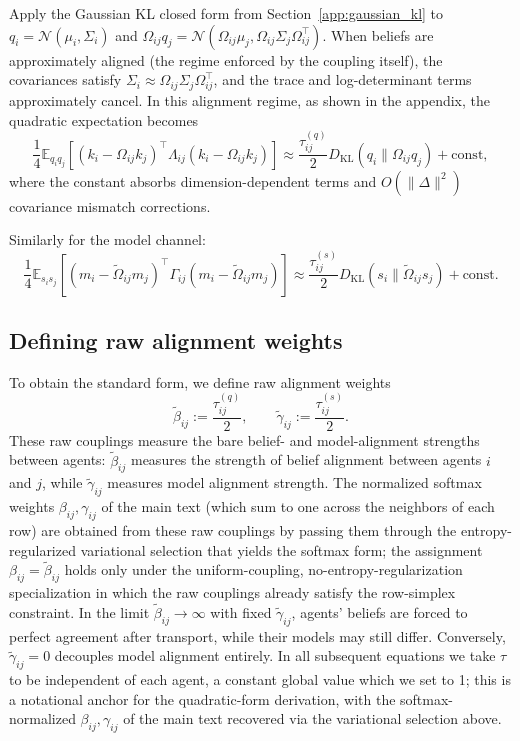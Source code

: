 \documentclass[11pt]{article}
\begin{document}
Apply the Gaussian KL closed form from Section~\ref{app:gaussian_kl} to $q_i = \mathcal{N}(\mu_i,\Sigma_i)$ and $\Omega_{ij}q_j = \mathcal{N}(\Omega_{ij}\mu_j, \Omega_{ij}\Sigma_j\Omega_{ij}^\top)$. When beliefs are approximately aligned (the regime enforced by the coupling itself), the covariances satisfy $\Sigma_i \approx \Omega_{ij}\Sigma_j\Omega_{ij}^\top$, and the trace and log-determinant terms approximately cancel. In this alignment regime, as shown in the appendix, the quadratic expectation becomes
\begin{equation}
\frac{1}{4}\mathbb{E}_{q_i q_j}
[(k_i-\Omega_{ij}k_j)^\top\Lambda_{ij}(k_i-\Omega_{ij}k_j)]
\approx
\frac{\tau^{(q)}_{ij}}{2}D_{\mathrm{KL}}(q_i\|\Omega_{ij}q_j)+\text{const},
\end{equation}
where the constant absorbs dimension-dependent terms and $O(\|\Delta\|^2)$ covariance mismatch corrections.

Similarly for the model channel:
\begin{equation}
\frac{1}{4}\mathbb{E}_{s_i s_j}
[(m_i-\tilde{\Omega}_{ij}m_j)^\top\Gamma_{ij}(m_i-\tilde{\Omega}_{ij}m_j)]
\approx
\frac{\tau^{(s)}_{ij}}{2}D_{\mathrm{KL}}(s_i\|\tilde{\Omega}_{ij}s_j)+\text{const}.
\end{equation}
\subsection{Defining raw alignment weights}
To obtain the standard form, we define raw alignment weights
\begin{equation}
\tilde\beta_{ij}:=\frac{\tau^{(q)}_{ij}}{2},
\qquad
\tilde\gamma_{ij}:=\frac{\tau^{(s)}_{ij}}{2}.
\end{equation}
These raw couplings measure the bare belief- and model-alignment strengths between agents: $\tilde\beta_{ij}$ measures the strength of belief alignment between agents $i$ and $j$, while $\tilde\gamma_{ij}$ measures model alignment strength. The normalized softmax weights $\beta_{ij}, \gamma_{ij}$ of the main text (which sum to one across the neighbors of each row) are obtained from these raw couplings by passing them through the entropy-regularized variational selection that yields the softmax form; the assignment $\beta_{ij} = \tilde\beta_{ij}$ holds only under the uniform-coupling, no-entropy-regularization specialization in which the raw couplings already satisfy the row-simplex constraint. In the limit $\tilde\beta_{ij} \to \infty$ with fixed $\tilde\gamma_{ij}$, agents' beliefs are forced to perfect agreement after transport, while their models may still differ. Conversely, $\tilde\gamma_{ij} = 0$ decouples model alignment entirely. In all subsequent equations we take $\tau$ to be independent of each agent, a constant global value which we set to 1; this is a notational anchor for the quadratic-form derivation, with the softmax-normalized $\beta_{ij}, \gamma_{ij}$ of the main text recovered via the variational selection above.
\end{document}

